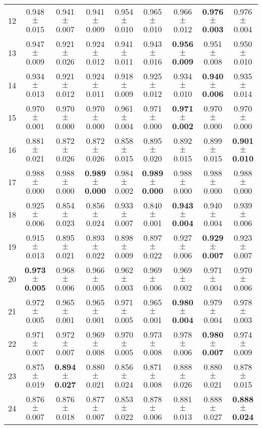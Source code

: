 \begin{table}[!ht]
{\begin{tabular}{r c c c c c c c c}
12 & 0.948 $\pm$ 0.015 & 0.941 $\pm$ 0.007 & 0.941 $\pm$ 0.009 & 0.954 $\pm$ 0.010 & 0.965 $\pm$ 0.010 & 0.966 $\pm$ 0.012 & \textbf{0.976 $\pm$ 0.003} & 0.976 $\pm$ 0.004 \\
13 & 0.947 $\pm$ 0.009 & 0.921 $\pm$ 0.026 & 0.924 $\pm$ 0.012 & 0.941 $\pm$ 0.011 & 0.943 $\pm$ 0.016 & \textbf{0.956 $\pm$ 0.009} & 0.951 $\pm$ 0.008 & 0.950 $\pm$ 0.010 \\
14 & 0.934 $\pm$ 0.013 & 0.921 $\pm$ 0.012 & 0.924 $\pm$ 0.011 & 0.918 $\pm$ 0.009 & 0.925 $\pm$ 0.012 & 0.934 $\pm$ 0.010 & \textbf{0.940 $\pm$ 0.006} & 0.935 $\pm$ 0.014 \\
15 & 0.970 $\pm$ 0.001 & 0.970 $\pm$ 0.000 & 0.970 $\pm$ 0.000 & 0.961 $\pm$ 0.004 & 0.971 $\pm$ 0.000 & \textbf{0.971 $\pm$ 0.002} & 0.970 $\pm$ 0.000 & 0.970 $\pm$ 0.000 \\
16 & 0.881 $\pm$ 0.021 & 0.872 $\pm$ 0.026 & 0.872 $\pm$ 0.026 & 0.858 $\pm$ 0.015 & 0.895 $\pm$ 0.020 & 0.892 $\pm$ 0.015 & 0.899 $\pm$ 0.015 & \textbf{0.901 $\pm$ 0.010} \\
17 & 0.988 $\pm$ 0.000 & 0.988 $\pm$ 0.000 & \textbf{0.989 $\pm$ 0.000} & 0.984 $\pm$ 0.002 & \textbf{0.989 $\pm$ 0.000} & 0.988 $\pm$ 0.000 & 0.988 $\pm$ 0.000 & 0.988 $\pm$ 0.000 \\
18 & 0.925 $\pm$ 0.006 & 0.854 $\pm$ 0.023 & 0.856 $\pm$ 0.024 & 0.933 $\pm$ 0.007 & 0.840 $\pm$ 0.001 & \textbf{0.943 $\pm$ 0.004} & 0.940 $\pm$ 0.004 & 0.939 $\pm$ 0.006 \\
19 & 0.915 $\pm$ 0.013 & 0.895 $\pm$ 0.021 & 0.893 $\pm$ 0.022 & 0.898 $\pm$ 0.009 & 0.897 $\pm$ 0.022 & 0.927 $\pm$ 0.006 & \textbf{0.929 $\pm$ 0.007} & 0.923 $\pm$ 0.007 \\
20 & \textbf{0.973 $\pm$ 0.005} & 0.968 $\pm$ 0.006 & 0.966 $\pm$ 0.005 & 0.962 $\pm$ 0.003 & 0.969 $\pm$ 0.006 & 0.969 $\pm$ 0.002 & 0.971 $\pm$ 0.004 & 0.970 $\pm$ 0.006 \\
21 & 0.972 $\pm$ 0.005 & 0.965 $\pm$ 0.001 & 0.965 $\pm$ 0.001 & 0.971 $\pm$ 0.005 & 0.965 $\pm$ 0.001 & \textbf{0.980 $\pm$ 0.004} & 0.979 $\pm$ 0.004 & 0.978 $\pm$ 0.003 \\
22 & 0.971 $\pm$ 0.007 & 0.972 $\pm$ 0.007 & 0.969 $\pm$ 0.008 & 0.970 $\pm$ 0.005 & 0.973 $\pm$ 0.008 & 0.978 $\pm$ 0.006 & \textbf{0.980 $\pm$ 0.007} & 0.974 $\pm$ 0.009 \\
23 & 0.875 $\pm$ 0.019 & \textbf{0.894 $\pm$ 0.027} & 0.880 $\pm$ 0.021 & 0.856 $\pm$ 0.024 & 0.871 $\pm$ 0.008 & 0.888 $\pm$ 0.026 & 0.880 $\pm$ 0.021 & 0.878 $\pm$ 0.015 \\
24 & 0.876 $\pm$ 0.007 & 0.876 $\pm$ 0.018 & 0.877 $\pm$ 0.007 & 0.853 $\pm$ 0.022 & 0.878 $\pm$ 0.006 & 0.881 $\pm$ 0.013 & 0.888 $\pm$ 0.027 & \textbf{0.888 $\pm$ 0.024} \\

\end{tabular}}
\end{table}

